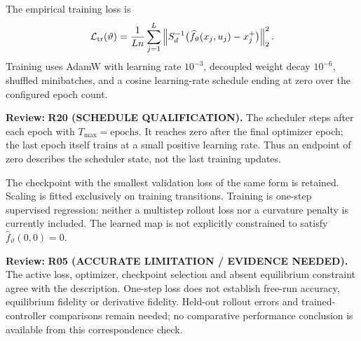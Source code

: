 \documentclass[11pt]{article}
\newcommand{\review}[1]{\par\noindent\textcolor{red!70!black}{\textbf{Review:} #1}\par}
\begin{document}
The empirical training loss is
\begin{equation}\label{eq:loss}
\mathcal L_{\rm tr}(\vartheta)=\frac1{Ln}\sum_{j=1}^L\left\|S_d^{-1}\bigl(\widehat f_\vartheta(x_j,u_j)-x_j^+\bigr)\right\|_2^2.
\end{equation}
Training uses AdamW with learning rate $10^{-3}$, decoupled weight decay $10^{-6}$, shuffled minibatches, and a cosine learning-rate schedule ending at zero over the configured epoch count.
\review{\textbf{R20 (SCHEDULE QUALIFICATION).} The scheduler steps after each epoch with $T_{\max}=\text{epochs}$. It reaches zero after the final optimizer epoch; the last epoch itself trains at a small positive learning rate. Thus an endpoint of zero describes the scheduler state, not the last training updates.}
 The checkpoint with the smallest validation loss of the same form is retained. Scaling is fitted exclusively on training transitions. Training is one-step supervised regression: neither a multistep rollout loss nor a curvature penalty is currently included. The learned map is not explicitly constrained to satisfy $\widehat f_\vartheta(0,0)=0$.
\review{\textbf{R05 (ACCURATE LIMITATION / EVIDENCE NEEDED).} The active loss, optimizer, checkpoint selection and absent equilibrium constraint agree with the description. One-step loss does not establish free-run accuracy, equilibrium fidelity or derivative fidelity. Held-out rollout errors and trained-controller comparisons remain needed; no comparative performance conclusion is available from this correspondence check.}
\end{document}
